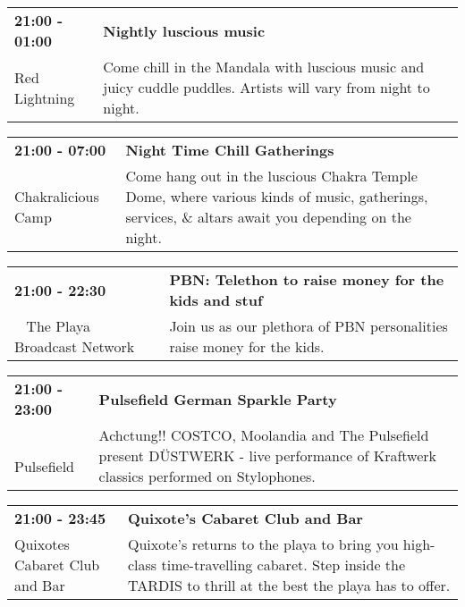 \begin{tabular}{ p{1in} p{2.2in} }
    \textbf{21:00 - 01:00} & \textbf{Nightly luscious music} \\
    Red Lightning \newline  & Come chill in the Mandala with luscious music and juicy cuddle puddles. Artists will vary from night to night. \\
    \hline 
\end{tabular}
    
\begin{tabular}{ p{1in} p{2.2in} }
    \textbf{21:00 - 07:00} & \textbf{Night Time Chill Gatherings} \\
    Chakralicious Camp \newline  & Come hang out in the luscious Chakra Temple Dome, where various kinds of music, gatherings, services, \& altars await you depending on the night. \\
    \hline 
\end{tabular}
    
\begin{tabular}{ p{1in} p{2.2in} }
    \textbf{21:00 - 22:30} & \textbf{PBN: Telethon to raise money for the kids and stuf} \\
    ~ \newline The Playa Broadcast Network & Join us as our plethora of PBN personalities raise money for the kids. \\
    \hline 
\end{tabular}
    
\begin{tabular}{ p{1in} p{2.2in} }
    \textbf{21:00 - 23:00} & \textbf{Pulsefield German Sparkle Party} \\
    ~ \newline Pulsefield & Achctung!! COSTCO, Moolandia and The Pulsefield present D\"USTWERK - live performance of Kraftwerk classics performed on Stylophones. \\
    \hline 
\end{tabular}
    
\begin{tabular}{ p{1in} p{2.2in} }
    \textbf{21:00 - 23:45} & \textbf{Quixote's Cabaret Club and Bar } \\
    Quixotes Cabaret Club and Bar \newline  & Quixote's returns to the playa to bring you high-class time-travelling cabaret. Step inside the TARDIS to thrill at the best the playa has to offer. \\
    \hline 
\end{tabular}
    

